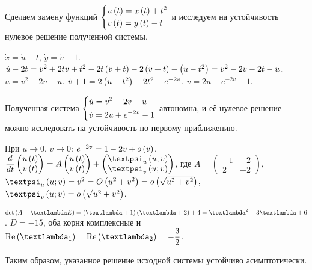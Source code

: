 \documentclass[a5paper,10pt]{article}
\begin{document}
Сделаем замену функций
$\left\{ \begin{aligned}& u\left(t\right) = x\left(t\right) + t^2 \\& v\left(t\right) = y\left(t\right) - t\end{aligned} \right.$ и исследуем на устойчивость нулевое решение полученной системы.

$\dot{x} = \dot{u} - t$, $\dot{y} = \dot{v} + 1$.
$\dot{u} - 2t
= v^2 + 2tv + t^2 - 2t\left(v + t\right) - 2\left(v + t\right) - \left(u - t^2\right)
= v^2 - 2v - 2t - u$.
$\dot{u} = v^2 - 2v - u$.
$\dot{v} + 1 = 2\left(u - t^2\right) + 2t^2 + e^{-2v}$.
$\dot{v} = 2u + e^{-2v} - 1$.

Полученная система $\left\{ \begin{aligned}& \dot{u} = v^2 - 2v - u \\& \dot{v} = 2u + e^{-2v} - 1\end{aligned} \right.$ автономна, и её нулевое решение можно исследовать на устойчивость по первому приближению.

При $u \to 0$, $v \to 0$:
$e^{-2v} = 1 - 2v + o\left(v\right)$. $\dfrac {d} {dt} \begin{pmatrix} u\br{t} \\ v\br{t} \end{pmatrix} = A \begin{pmatrix} u\br{t} \\ v\br{t} \end{pmatrix} + \begin{pmatrix} \psi_{u}\br{u; v} \\ \psi_{v}\br{u; v} \end{pmatrix}$, где 
$A = \begin{pmatrix} -1 & -2 \\ 2 & -2 \end{pmatrix}$,
$\psi_{u}\br{u; v} = v^2 = O\br{u^2 + v^2} = o\br{\sqrt{u^2 + v^2}}$,
$\psi_{v}\br{u; v} = o\br{\sqrt{u^2 + v^2}}$.

$\det\br{A - \lambda E} = \br{\lambda + 1}\br{\lambda + 2} + 4 = \lambda^2 + 3\lambda + 6$. $D = -15$, оба корня комплексные и $\Re\br{\lambda_{1}} = \Re\br{\lambda_{2}} = -\dfrac {3} {2}$. 

Таким образом, указанное решение исходной системы устойчиво асимптотически.
\end{document}
